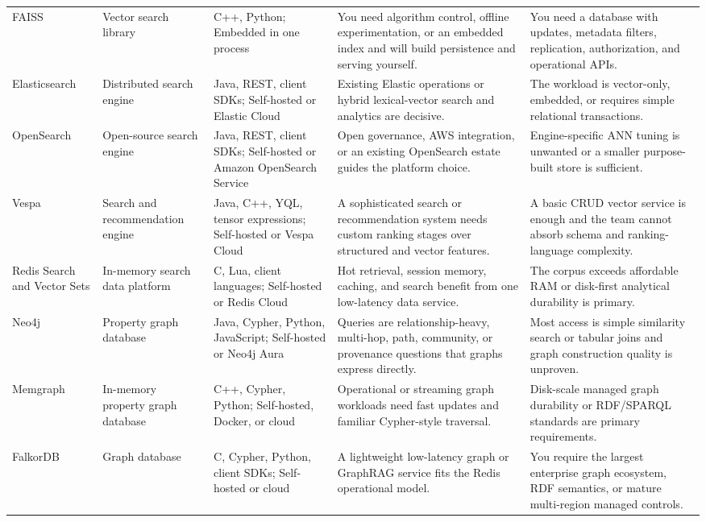 \begin{longtable}{@{}p{20mm}p{22mm}p{26mm}p{46mm}p{46mm}@{}}
FAISS & Vector search library & C++, Python; Embedded in one process & You need algorithm control, offline experimentation, or an embedded index and will build persistence and serving yourself. & You need a database with updates, metadata filters, replication, authorization, and operational APIs.\\
Elasticsearch & Distributed search engine & Java, REST, client SDKs; Self-hosted or Elastic Cloud & Existing Elastic operations or hybrid lexical-vector search and analytics are decisive. & The workload is vector-only, embedded, or requires simple relational transactions.\\
OpenSearch & Open-source search engine & Java, REST, client SDKs; Self-hosted or Amazon OpenSearch Service & Open governance, AWS integration, or an existing OpenSearch estate guides the platform choice. & Engine-specific ANN tuning is unwanted or a smaller purpose-built store is sufficient.\\
Vespa & Search and recommendation engine & Java, C++, YQL, tensor expressions; Self-hosted or Vespa Cloud & A sophisticated search or recommendation system needs custom ranking stages over structured and vector features. & A basic CRUD vector service is enough and the team cannot absorb schema and ranking-language complexity.\\
Redis Search and Vector Sets & In-memory search data platform & C, Lua, client languages; Self-hosted or Redis Cloud & Hot retrieval, session memory, caching, and search benefit from one low-latency data service. & The corpus exceeds affordable RAM or disk-first analytical durability is primary.\\
Neo4j & Property graph database & Java, Cypher, Python, JavaScript; Self-hosted or Neo4j Aura & Queries are relationship-heavy, multi-hop, path, community, or provenance questions that graphs express directly. & Most access is simple similarity search or tabular joins and graph construction quality is unproven.\\
Memgraph & In-memory property graph database & C++, Cypher, Python; Self-hosted, Docker, or cloud & Operational or streaming graph workloads need fast updates and familiar Cypher-style traversal. & Disk-scale managed graph durability or RDF/SPARQL standards are primary requirements.\\
FalkorDB & Graph database & C, Cypher, Python, client SDKs; Self-hosted or cloud & A lightweight low-latency graph or GraphRAG service fits the Redis operational model. & You require the largest enterprise graph ecosystem, RDF semantics, or mature multi-region managed controls.\\

\end{longtable}
